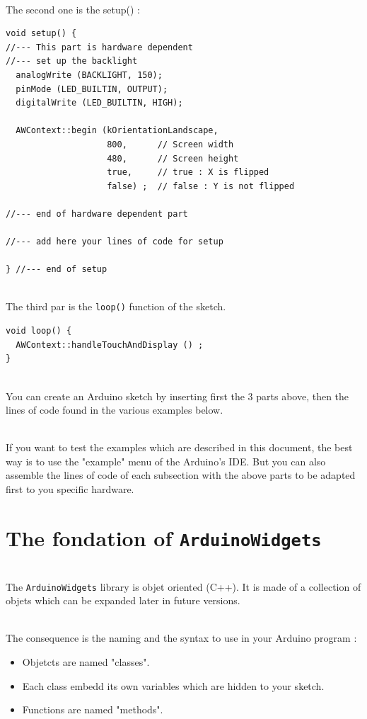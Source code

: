 \documentclass[a4paper,11pt]{extarticle}
\begin{document}
~\\The second one is  the setup() :
\begin{lstlisting}[language=Arduinonl]
void setup() {
//--- This part is hardware dependent
//--- set up the backlight
  analogWrite (BACKLIGHT, 150);
  pinMode (LED_BUILTIN, OUTPUT);
  digitalWrite (LED_BUILTIN, HIGH);

  AWContext::begin (kOrientationLandscape,
                    800,      // Screen width
                    480,      // Screen height
                    true,     // true : X is flipped
                    false) ;  // false : Y is not flipped

//--- end of hardware dependent part

//--- add here your lines of code for setup

} //--- end of setup
\end{lstlisting}

~\\The third par is the \texttt{loop()} function of the sketch.
 
\begin{lstlisting}[language=Arduinonl]
void loop() {
  AWContext::handleTouchAndDisplay () ;
}  
\end{lstlisting}
~\\You can create an Arduino sketch by inserting first the 3 parts above, then the lines of code found in the various examples below.
  
~\\If you want to test the examples which are described in this document, the best way is to use the "example" menu of the Arduino's IDE. But you can also assemble the lines of code of each subsection with the above parts to be adapted first to you specific hardware.
  
\newpage
\section{The fondation of \texttt{ArduinoWidgets}}

~\\The \texttt{ArduinoWidgets} library is objet oriented (C++). It is made of a collection of objets which can be expanded later in future versions.

~\\The consequence is the naming and the syntax to use in your Arduino program : 
\begin{itemize}
\item Objetcts are named "classes".
\item Each class embedd its own variables which are hidden to your sketch.
\item Functions are named "methods".
\end{itemize}
\end{document}
